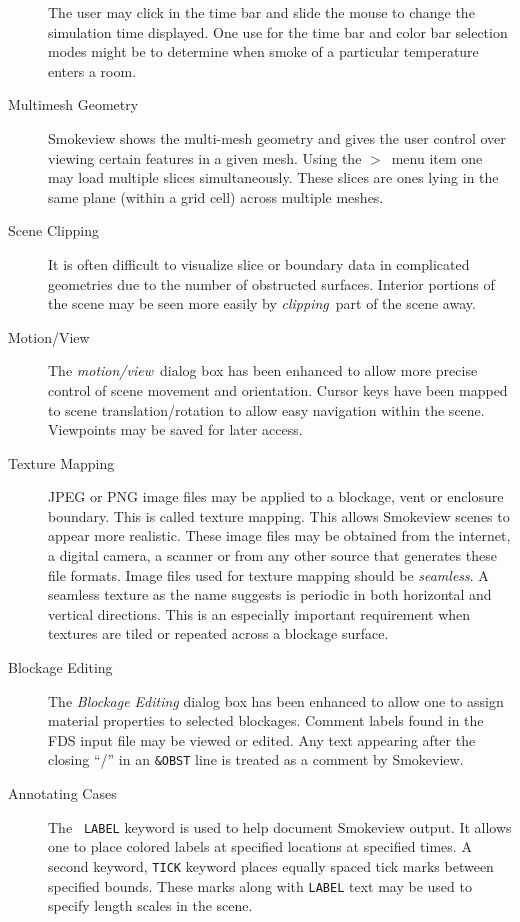 \documentclass[11pt,twoside]{book}
\newcommand{\frameit}[1]{\fbox{\tt #1}}
\begin{document}
\begin{description}
The user may click in the time bar and slide the mouse to
change the simulation time displayed. One use for the time
bar and color bar selection modes might be to determine
when smoke of a particular temperature enters a room.

\item[Multimesh Geometry] Smokeview shows the multi-mesh geometry
and gives the user control over viewing certain
features in a given mesh. Using the
\frameit{LOAD/UNLOAD}$>$\ menu item one may
load multiple slices simultaneously. These slices are ones
lying in the same plane (within a grid cell) across multiple
meshes.

\item[Scene Clipping] It is often difficult to visualize slice or
boundary data in complicated geometries due to the number of
obstructed surfaces. Interior portions of the scene may be
seen more easily by {\em clipping}\ part of the scene away.

\item[Motion/View] The {\em motion/view}\ dialog box has been enhanced to
allow more precise control of scene movement and orientation.
Cursor keys have been mapped to scene translation/rotation to
allow easy navigation within the scene.  Viewpoints may be saved for later access.

\item[Texture Mapping] JPEG or PNG image files may be applied to a
blockage, vent or enclosure boundary. This is called texture
mapping.  This allows Smokeview scenes to appear more
realistic. These image files may be obtained from the
internet, a digital camera, a scanner or from any other source
that generates these file formats. Image files used for texture
mapping should be {\em seamless}. A seamless texture as the name
suggests is periodic in both horizontal and vertical directions.
This is an especially important requirement when textures are tiled or
repeated across a blockage surface.

\item[Blockage Editing] The {\em Blockage Editing} dialog box has been
enhanced to allow one to assign material properties to selected
blockages. Comment labels found in the FDS input file may be
viewed or edited.  Any text appearing after the closing ``/'' in
an {\tt \&OBST} line is treated as a comment by Smokeview.

\item[Annotating Cases]The {\tt
LABEL} keyword is used to help document Smokeview output.
It allows one to place colored labels at specified
locations at specified times.  A second keyword, {\tt TICK} keyword places
equally spaced tick marks between specified bounds. These marks
along with {\tt LABEL} text may be used to specify length scales
in the scene.


\end{description}
\end{document}
